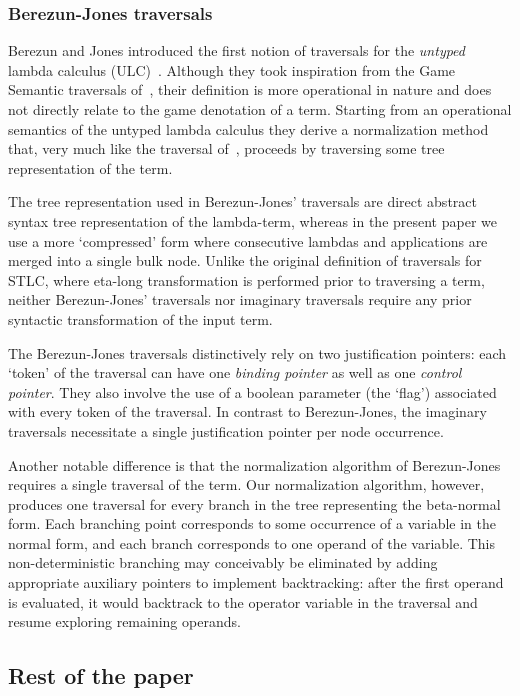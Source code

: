 \documentclass{elsarticle}
\theoremstyle{plain}
\theoremstyle{definition}
\theoremstyle{remark}
\begin{document}
\subsubsection{Berezun-Jones traversals}
Berezun and Jones introduced the first notion of traversals for the \emph{untyped} lambda calculus (ULC)~\cite{JonesBerezunLLL}. Although they took inspiration from the Game Semantic traversals of~\cite{Ong2006,BlumGalop2008}, their definition is more operational in nature and does not directly relate to the game denotation of a term. Starting from an operational semantics of the untyped lambda calculus they derive a normalization method that, very much like the traversal of~\cite{Ong2006, BlumPhd}, proceeds by traversing some tree representation of the term.

The tree representation used in Berezun-Jones' traversals are direct abstract syntax tree representation of the lambda-term, whereas in the present paper we use a more `compressed' form where consecutive lambdas and applications are merged into a single bulk node. Unlike the original definition of traversals for STLC, where eta-long transformation is performed prior to traversing a term, neither Berezun-Jones' traversals nor imaginary traversals require any prior syntactic transformation of the input term.

The Berezun-Jones traversals distinctively rely on two justification pointers: each `token' of the traversal can have one \emph{binding pointer} as well as one \emph{control pointer}. They also involve the use of a boolean parameter (the `flag') associated with every token of the traversal. In contrast to Berezun-Jones, the imaginary traversals necessitate a single justification pointer per node occurrence.

Another notable difference is that the normalization algorithm of Berezun-Jones requires a single traversal of the term. Our normalization algorithm, however, produces one traversal for every branch in the tree representing the beta-normal form. Each branching point corresponds to some occurrence of a variable in the normal form, and each branch corresponds to one operand of the variable. This non-deterministic branching may conceivably be eliminated by adding appropriate auxiliary pointers to implement backtracking: after the first operand is evaluated, it would backtrack to the operator variable in the traversal and resume exploring remaining operands.

\subsection{Rest of the paper}
\end{document}
